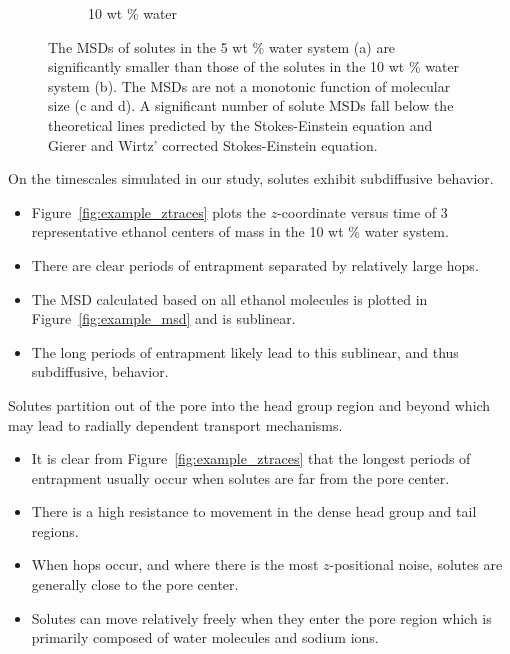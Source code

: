 \documentclass{article}
\begin{document}
\begin{figure}
\begin{subfigure}{0.45\textwidth}
  \caption{10 wt \% water}\label{fig:msd_radius_10wt}
  \end{subfigure}
  \caption{The MSDs of solutes in the 5 wt \% water system (a) are significantly
  smaller than those of the solutes in the 10 wt \% water system (b). The
  MSDs are not a monotonic function of molecular size (c and d). A significant
  number of solute MSDs fall below the theoretical lines predicted by the 
  Stokes-Einstein equation and Gierer and Wirtz' corrected Stokes-Einstein equation.}\label{fig:msds}
  \end{figure}  
  \noindent On the timescales simulated in our study, solutes exhibit subdiffusive behavior.
  \begin{itemize}  
    \item Figure~\ref{fig:example_ztraces} plots the $z$-coordinate versus time of
  	3 representative ethanol centers of mass in the 10 wt \% water system.
  	\item There are clear periods of entrapment separated by relatively large hops.
	\item The MSD calculated based on all ethanol molecules is plotted in 
	Figure~\ref{fig:example_msd} and is sublinear.
	\item The long periods of entrapment likely lead to this sublinear, and thus
	subdiffusive, behavior.
  \end{itemize}
  
  
  \noindent Solutes partition out of the pore into the head group region and beyond which
  may lead to radially dependent transport mechanisms.
  \begin{itemize}
    \item It is clear from Figure~\ref{fig:example_ztraces} that the longest 
    periods of entrapment usually occur when solutes are far from the pore
    center.
    \item There is a high resistance to movement in the dense head group and
    tail regions.
    \item When hops occur, and where there is the most $z$-positional noise, 
    solutes are generally close to the pore center.
    \item Solutes can move relatively freely when they enter the pore region
    which is primarily composed of water molecules and sodium ions.
  \end{itemize}
  
\end{document}

